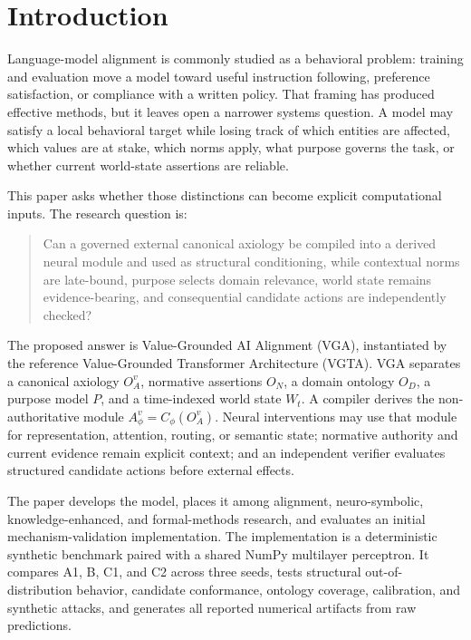 \section{Introduction}
\label{sec:introduction}

Language-model alignment is commonly studied as a behavioral problem: training and evaluation move a model toward useful instruction following, preference satisfaction, or compliance with a written policy. That framing has produced effective methods, but it leaves open a narrower systems question. A model may satisfy a local behavioral target while losing track of which entities are affected, which values are at stake, which norms apply, what purpose governs the task, or whether current world-state assertions are reliable.

This paper asks whether those distinctions can become explicit computational inputs. The research question is:

\begin{quote}
Can a governed external canonical axiology be compiled into a derived neural module and used as structural conditioning, while contextual norms are late-bound, purpose selects domain relevance, world state remains evidence-bearing, and consequential candidate actions are independently checked?
\end{quote}

The proposed answer is Value-Grounded AI Alignment (VGA), instantiated by the reference Value-Grounded Transformer Architecture (VGTA). VGA separates a canonical axiology $O_A^v$, normative assertions $O_N$, a domain ontology $O_D$, a purpose model $P$, and a time-indexed world state $W_t$. A compiler derives the non-authoritative module $A_\phi^v=C_\phi(O_A^v)$. Neural interventions may use that module for representation, attention, routing, or semantic state; normative authority and current evidence remain explicit context; and an independent verifier evaluates structured candidate actions before external effects.

The paper develops the model, places it among alignment, neuro-symbolic, knowledge-enhanced, and formal-methods research, and evaluates an initial mechanism-validation implementation. The implementation is a deterministic synthetic benchmark paired with a shared NumPy multilayer perceptron. It compares A1, B, C1, and C2 across three seeds, tests structural out-of-distribution behavior, candidate conformance, ontology coverage, calibration, and synthetic attacks, and generates all reported numerical artifacts from raw predictions.


